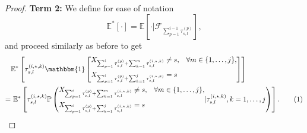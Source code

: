 \documentclass[twoside,11pt]{article}
\newcommand{\pow}[1]{^{(#1)}}%
\numberwithin{equation}{section}
\newcommand{\lp}{\left(}
\newcommand{\rp}{\right)}
\newcommand{\lb}{\left[}
\newcommand{\rb}{\right]}
\newcommand{\Pbb}{\mathbb{P}}
\newcommand{\Fcal}{\mathcal{F}}
\newcommand\numberthis{\addtocounter{equation}{1}\tag{\theequation}}
\newcommand{\prob}{\Pbb}
\newcommand{\expec}{\mathbb{E}}
\newcommand{\indicator}{\mathbbm{1}}
\begin{document}
\begin{proof}
\textbf{Term 2: }We define for ease of notation
\[
\expec^*[\cdot]=\expec[\cdot|\Fcal_{\sum_{p=1}^{i-1} \tau_{s,l}\pow{p}}],
\]
and proceed similarly as before to get
\begin{align*}
    &\expec^*\lb\tau_{s,l}\pow{i,\star,k} \indicator\lb             \begin{aligned}[c]
              &X_{\sum_{p=1}^i \tau_{s,l}\pow{p}
                  + \sum_{k=1}^{m}\tau_{s,l}\pow{i,\star,k}} \neq s,
                  &&\forall m \in \{1,\ldots,j\},\\
              &X_{\sum_{p=1}^i \tau_{s,l}\pow{p}
                  + \sum_{k=1}^j \tau_{s,l}\pow{i,\star,k}} = s
            \end{aligned}\rb\rb\\ 
     = & \ \expec^*\lb\tau_{s,l}\pow{i,\star,k}\prob\lp             \begin{aligned}[c]
              &X_{\sum_{p=1}^i \tau_{s,l}\pow{p}
                  + \sum_{k=1}^{m}\tau_{s,l}\pow{i,\star,k}} \neq s,
                  &&\forall m \in \{1,\ldots,j\},\\
              &X_{\sum_{p=1}^i \tau_{s,l}\pow{p}
                  + \sum_{k=1}^j \tau_{s,l}\pow{i,\star,k}} = s
            \end{aligned}| \tau_{s,l}\pow{i,\star,k}, k=1, \ldots, j \rp\rb.\numberthis\label{eq:ret-t-markeq3}
\end{align*}




\end{proof}
\end{document}
